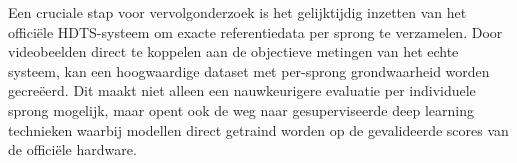 Een cruciale stap voor vervolgonderzoek is het gelijktijdig inzetten van het officiële HDTS-systeem om exacte referentiedata per sprong te verzamelen. Door videobeelden direct te koppelen aan de objectieve metingen van het echte systeem, kan een hoogwaardige dataset met per-sprong grondwaarheid worden gecreëerd. Dit maakt niet alleen een nauwkeurigere evaluatie per individuele sprong mogelijk, maar opent ook de weg naar gesuperviseerde deep learning technieken waarbij modellen direct getraind worden op de gevalideerde scores van de officiële hardware.
